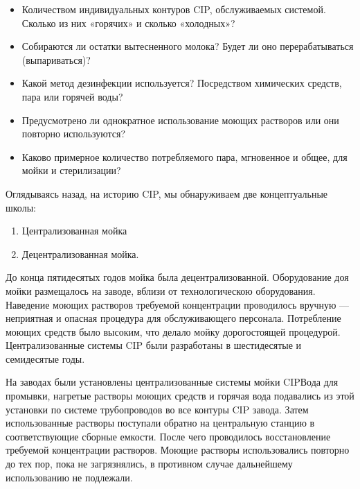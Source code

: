 \documentclass[a4paper,12pt,oneside]{extarticle}
\begin{document}
\begin{itemize}
	\item Количеством индивидуальных контуров CIP, обслуживаемых системой. Сколько из них «горячих» и сколько «холодных»?
	\item Собираются ли остатки вытесненного молока? Будет ли оно перерабатываться (выпариваться)?
	\item Какой метод дезинфекции используется? Посредством химических средств, пара или горячей воды?
	\item Предусмотрено ли однократное использование моющих растворов или они повторно используются?
	\item  Каково примерное количество потребляемого пара, мгновенное и общее, для мойки и стерилизации?
\end{itemize}

\begin{flushleft}
	Оглядываясь назад, на историю CIP, мы обнаруживаем две концептуальные школы:
\end{flushleft}
 
 \begin{enumerate}
 	\item Централизованная мойка
 	\item Децентрализованная мойка.
 \end{enumerate}
 
\begin{flushleft}
	До конца пятидесятых годов мойка была децентрализованной. Оборудование доя мойки размещалось на заводе, вблизи от технологическою оборудования. Наведение моющих растворов требуемой концентрации проводилось вручную — неприятная и опасная процедура для обслуживающего персонала. Потребление моющих средств было высоким, что делало мойку дорогостоящей процедурой.
	Централизованные системы CIP были разработаны в шестидесятые и семидесятые годы.
\end{flushleft}	

\begin{flushleft}
	На заводах были установлены централизованные системы мойки CIPВода для промывки, нагретые растворы моющих средств и горячая вода подавались из этой установки по системе трубопроводов во все контуры CIP завода. Затем использованные растворы поступали обратно на центральную станцию в соответствующие сборные емкости. После чего проводилось восстановление требуемой концентрации растворов. Моющие растворы использовались повторно до тех пор, пока не загрязнялись, в противном случае дальнейшему использованию не подлежали.
\end{flushleft}
\end{document}
